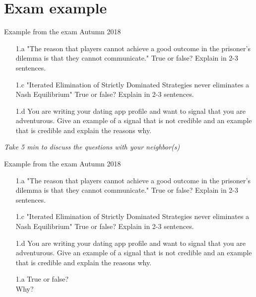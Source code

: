 \section{Exam example}

\begin{frame}{Example from the exam Autumn 2018}
\begin{multicols}{2}
  \begin{itemize}
    \item[1.a] "The reason that players cannot achieve a good outcome in the prisoner’s dilemma is that they cannot communicate." True or false? Explain in 2-3 sentences.
    \item[1.c] "Iterated Elimination of Strictly Dominated Strategies never eliminates a Nash Equilibrium" True or false? Explain in 2-3 sentences.
    \item[1.d] You are writing your dating app profile and want to signal that you are adventurous. Give an example of a signal that is not credible and an example that is credible and explain the reasons why.
  \end{itemize}
\vfill\null \columnbreak
\textit{Take 5 min to discuss the questions with your neighbor(s)}
\end{multicols}
\end{frame}

\begin{frame}{Example from the exam Autumn 2018}
\begin{multicols}{2}\color{lightgray}
  \begin{itemize}
    \item[1.a] "The reason that players cannot achieve a good outcome in the prisoner’s dilemma is that they cannot communicate." True or false? Explain in 2-3 sentences.
    \color{lightgray}
    \item[\color{lightgray}1.c] "Iterated Elimination of Strictly Dominated Strategies never eliminates a Nash Equilibrium" True or false? Explain in 2-3 sentences.
    \item[\color{lightgray}1.d] You are writing your dating app profile and want to signal that you are adventurous. Give an example of a signal that is not credible and an example that is credible and explain the reasons why.
  \end{itemize}
\vfill\null \columnbreak
\begin{itemize}
  \item[1.a] True or false? \\ Why?
\end{itemize}
\end{multicols}
\end{frame}

